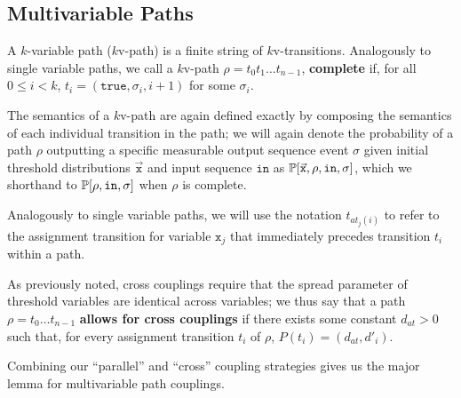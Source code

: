 \subsection{Multivariable Paths}

\begin{defn}
    A $k$-variable path ($k$v-path) is a finite string of $k$v-transitions. Analogously to single variable paths, we call a $k$v-path $\rho = t_0t_1\ldots t_{n-1}$, \textbf{complete} if, for all $0\leq i < k$, $t_i = (\texttt{true}, \sigma_i, i+1)$ for some $\sigma_i$.
\end{defn}

The semantics of a $k$v-path are again defined exactly by composing the semantics of each individual transition in the path; we will again denote the probability of a path $\rho$ outputting a specific measurable output sequence event $\sigma$ given initial threshold distributions $\vec{\texttt{x}}$ and input sequence $\texttt{in}$ as $\mathbb{P}[\vec{\texttt{x}}, \rho, \texttt{in}, \sigma]$, which we shorthand to $\mathbb{P}[\rho, \texttt{in}, \sigma]$ when $\rho$ is complete.

Analogously to single variable paths, we will use the notation $t_{at_j(i)}$ to refer to the assignment transition for variable $\texttt{x}_j$ that immediately precedes transition $t_i$ within a path. 

As previously noted, cross couplings require that the spread parameter of threshold variables are identical across variables; we thus say that a path $\rho = t_0\ldots t_{n-1}$ \textbf{allows for cross couplings} if there exists some constant $d_{at}>0$ such that, for every assignment transition $t_i$ of $\rho$, $P(t_i) = (d_{at}, d'_i)$. 


Combining our ``parallel'' and ``cross'' coupling strategies gives us the major lemma for multivariable path couplings.

